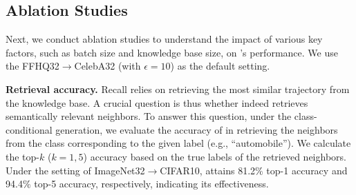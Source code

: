 \subsection{Ablation Studies}
\label{sec:ablation}

Next, we conduct ablation studies to understand the impact of various key factors, such as batch size and knowledge base size, on \system's performance. We use the FFHQ32$\rightarrow$CelebA32 (with $\epsilon = 10$) %
as the default setting.


{\bf Retrieval accuracy.} Recall \system relies on retrieving the most similar trajectory from the knowledge base. A crucial question is thus whether \system indeed retrieves semantically relevant neighbors. To answer this question, under the class-conditional generation, we evaluate the accuracy of \system in retrieving the neighbors from the class corresponding to the given label (e.g., ``automobile''). 
We calculate the top-$k$ ($k = 1, 5$) accuracy based on the true labels of the retrieved neighbors. Under the setting of ImageNet32$\rightarrow$CIFAR10, \system attains 81.2$\%$ top-1 accuracy and 94.4$\%$ top-5 accuracy, respectively, indicating its effectiveness. %




